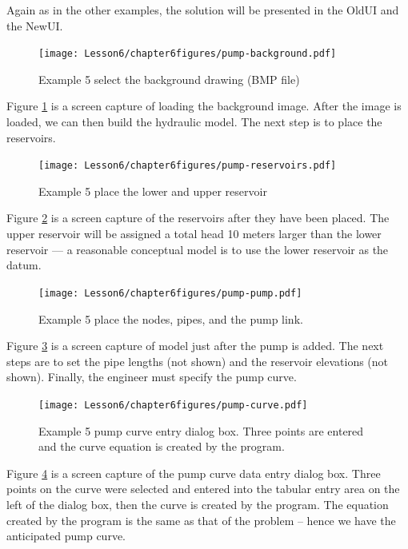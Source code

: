 Again as in the other examples, the solution will be presented in the OldUI and the NewUI.

\begin{figure}[h!] %
   \centering
   \texttt{[image: Lesson6/chapter6figures/pump-background.pdf]} 
   \caption{Example 5 select the background drawing (BMP file)}
   \label{fig:pump-background.pdf}
\end{figure}
Figure \ref{fig:pump-background.pdf} is a screen capture of loading the background image.   After the image is loaded, we can then build the hydraulic model.  The next step is to place the reservoirs.


\begin{figure}[h!] %
   \centering
   \texttt{[image: Lesson6/chapter6figures/pump-reservoirs.pdf]} 
   \caption{Example 5 place the lower and upper reservoir}
   \label{fig:pump-reservoirs.pdf}
\end{figure}
Figure \ref{fig:pump-reservoirs.pdf} is a screen capture of the reservoirs after they have been placed.  The upper reservoir will be assigned a total head 10 meters larger than the lower reservoir --- a reasonable conceptual model is to use the lower reservoir as the datum.
\newpage

\begin{figure}[h!] %
   \centering
   \texttt{[image: Lesson6/chapter6figures/pump-pump.pdf]} 
   \caption{Example 5 place the nodes, pipes, and the pump link.}
   \label{fig:pump-pump.pdf}
\end{figure}
Figure \ref{fig:pump-pump.pdf} is a screen capture of model just after the pump is added.   The next steps are to set the pipe lengths (not shown) and the reservoir elevations (not shown).   Finally, the engineer must specify the pump curve.
\newpage

\begin{figure}[h!] %
   \centering
   \texttt{[image: Lesson6/chapter6figures/pump-curve.pdf]} 
   \caption{Example 5 pump curve entry dialog box.  Three points are entered and the curve equation is created by the program.}
   \label{fig:pump-curve.pdf}
\end{figure}
Figure \ref{fig:pump-curve.pdf} is a screen capture of the pump curve data entry dialog box.   Three points on the curve were selected and entered into the tabular entry area on the left of the dialog box, then the curve is created by the program.  The equation created by the program is the same as that of the problem -- hence we have the anticipated pump curve.
\newpage

